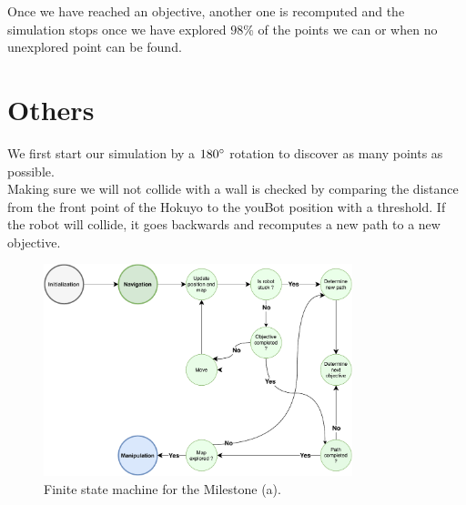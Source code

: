 \documentclass[a4paper, 10pt, conference]{ieeeconf}
\begin{document}
    Once we have reached an objective, another one is recomputed and the simulation stops once we have explored $98$\% of the points we can or when no unexplored point can be found.
    
    \section{Others}
    
    We first start our simulation by a $180\degree$ rotation to discover as many points as possible.\\
    
    Making sure we will not collide with a wall is checked by comparing the distance from the front point of the Hokuyo to the youBot position with a threshold. If the robot will collide, it goes backwards and recomputes a new path to a new objective.
    
    
    
    
    
    
    \newpage
    \onecolumn
    
    \begin{figure}
        \centering
        \includegraphics[width=0.8\textwidth]{resources/pdf/fsm.pdf}
        \caption{Finite state machine for the Milestone (a).}
        \label{fig:fsm}
    \end{figure}
\end{document}
